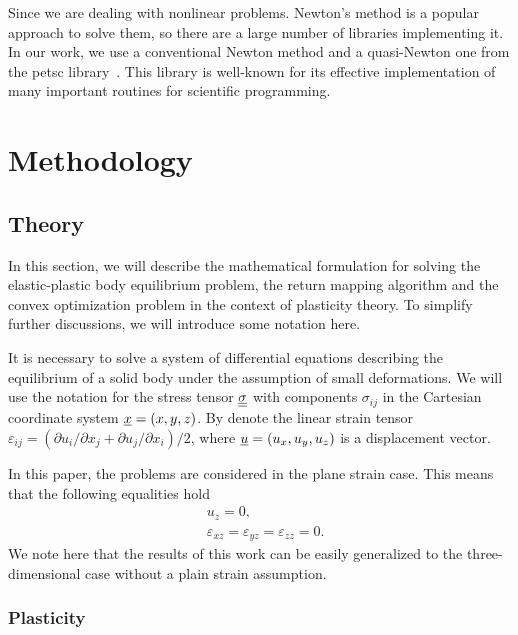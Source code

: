 \documentclass[12pt]{article}
\begin{document}
Since we are dealing with nonlinear problems. Newton's method is a popular approach to solve them, so there are a large number of libraries implementing it. In our work, we use a conventional Newton method and a quasi-Newton one from the petsc library~\parencite{petsc-user-ref}. This library is well-known for its effective implementation of many important routines for scientific programming. 

\newpage
\section{Methodology}

\subsection{Theory}
\label{sec:theory}

In this section, we will describe the mathematical formulation for solving the elastic-plastic body equilibrium problem, the return mapping algorithm and the convex optimization problem in the context of plasticity theory. To simplify further discussions, we will introduce some notation here. 

It is necessary to solve a system of differential equations describing the equilibrium of a solid body under the assumption of small deformations. We will use the notation for the stress tensor $\underline{\underline{\sigma}}$ with components $\sigma_{ij}$ in the Cartesian coordinate system $\underline{x} = (x, y, z)$. By denote the linear strain tensor $\varepsilon_{ij}=(\partial u_i/\partial x_j+\partial u_j/\partial x_i)/2$, where $\underline{u}=(u_x, u_y, u_z)$ is a displacement vector.

In this paper, the problems are considered in the plane strain case. This means that the following equalities hold
\begin{align*}
    & u_z = 0, \\
    & \varepsilon_{xz} = \varepsilon_{yz} = \varepsilon_{zz} = 0. 
\end{align*}
We note here that the results of this work can be easily generalized to the three-dimensional case without a plain strain assumption.

\subsubsection{Plasticity}
\label{sec:theory:plasticity}
\end{document}
